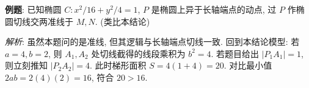 \begin{examplebox}
\textbf{例题}: 已知椭圆 $C: x^2/16 + y^2/4 = 1$, $P$ 是椭圆上异于长轴端点的动点, 过 $P$ 作椭圆切线交两准线于 $M, N$. (类比本结论)

\textit{解析}: 
虽然本题问的是准线, 但其逻辑与长轴端点切线一致. 回到本结论模型:
若 $a=4, b=2$, 则 $A_1, A_2$ 处切线截得的线段乘积为 $b^2=4$. 
若题目给出 $|P_1A_1| = 1$, 则立刻推知 $|P_2A_2| = 4$.
此时梯形面积 $S = 4(1+4) = 20$. 
对比最小值 $2ab = 2(4)(2) = 16$, 符合 $20 > 16$.
\end{examplebox}